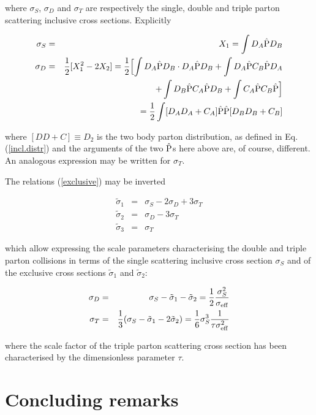 \documentclass{ws-rv9x6}
\begin{document}
\noindent where $\sigma_S$, $\sigma_D$ and $\sigma_T$ are respectively the single, double and triple parton scattering inclusive cross sections. Explicitly

\begin{eqnarray}
\sigma_S&=&X_1=\int D_A\hat{\rm P}D_B\nonumber\\
\sigma_D&=&{1\over2}[X_1^2-2X_2]={1\over2}\Bigl[\int D_A\hat{\rm P}D_B\cdot D_A\hat{\rm P}D_B+\int D_A\hat{\rm P}C_B\hat{\rm P}D_A\nonumber\\
&&\qquad\qquad\qquad\qquad\qquad+\int D_B\hat{\rm P}C_A\hat{\rm P}D_B+\int C_A\hat{\rm P}C_B\hat{\rm P}\Bigr]\nonumber\\
&&\qquad\qquad\quad={1\over2}\int[D_AD_A+C_A]\hat{\rm P}\hat{\rm P}[D_BD_B+C_B]
\end{eqnarray}

\noindent where $[DD+C]\equiv D_2$ is the two body parton
distribution, as defined in Eq.(\ref{incl.distr}) and the arguments of the two $\hat{\rm P}$s here above are, of course, different. An analogous expression may be written for $\sigma_T$.

The relations (\ref{exclusive}) may be inverted

\begin{eqnarray}\label{tildesigmas}
\tilde\sigma_1&=&\sigma_S-2\sigma_D+3\sigma_T\nonumber\\
\tilde\sigma_2&=&\sigma_D-3\sigma_T\\
\tilde\sigma_3&=&\sigma_T\nonumber
\end{eqnarray}

\noindent which allow expressing the scale parameters characterising the double and triple parton collisions in terms of the single scattering inclusive cross section $\sigma_S$ and of the exclusive cross sections $\tilde\sigma_1$ and $\tilde\sigma_2$:

\begin{eqnarray}\label{sdt}
\sigma_D&=&\sigma_S-\tilde\sigma_1-\tilde\sigma_2={1\over2}{\sigma_S^2\over\sigma_{\rm eff}}\nonumber\\
\sigma_T&=&{1\over3}(\sigma_S-\tilde\sigma_1-2\tilde\sigma_2)={1\over6}\sigma_S^3{1\over\tau\sigma_{\rm eff}^2}
\end{eqnarray}

\noindent where the scale factor of the triple parton scattering cross section has been characterised by the dimensionless parameter $\tau$\cite{dEnterria:2016ids, Snigirev}.

\section{Concluding remarks}
\end{document}
